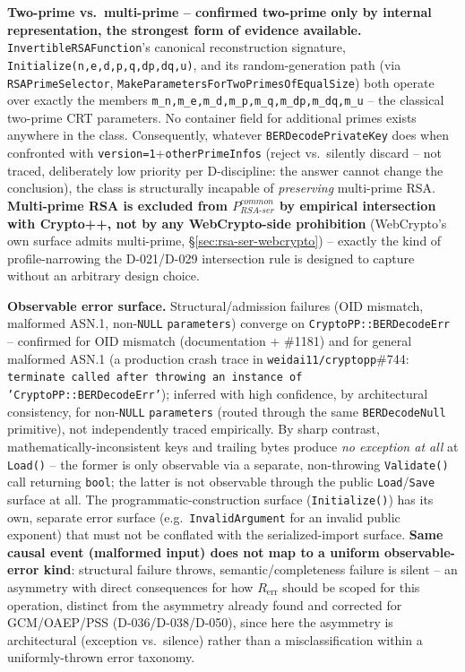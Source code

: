 \documentclass[11pt,a4paper]{article}
\begin{document}
\textbf{Two-prime vs.\ multi-prime -- confirmed two-prime only by internal representation, the strongest form of evidence available.} \texttt{InvertibleRSAFunction}'s canonical reconstruction signature, \texttt{Initialize(n,e,d,p,q,dp,dq,u)}, and its random-generation path (via \texttt{RSAPrimeSelector}, \texttt{MakeParametersForTwoPrimesOfEqualSize}) both operate over exactly the members \texttt{m\_n,m\_e,m\_d,m\_p,m\_q,m\_dp,m\_dq,m\_u} -- the classical two-prime CRT parameters. No container field for additional primes exists anywhere in the class. Consequently, whatever \texttt{BERDecodePrivateKey} does when confronted with \texttt{version=1}+\texttt{otherPrimeInfos} (reject vs.\ silently discard -- not traced, deliberately low priority per D-discipline: the answer cannot change the conclusion), the class is structurally incapable of \emph{preserving} multi-prime RSA. \textbf{Multi-prime RSA is excluded from $P_{RSA\text{-}ser}^{common}$ by empirical intersection with Crypto++, not by any WebCrypto-side prohibition} (WebCrypto's own surface admits multi-prime, \S\ref{sec:rsa-ser-webcrypto}) -- exactly the kind of profile-narrowing the D-021/D-029 intersection rule is designed to capture without an arbitrary design choice.

\textbf{Observable error surface.} Structural/admission failures (OID mismatch, malformed ASN.1, non-\texttt{NULL} \texttt{parameters}) converge on \texttt{CryptoPP::BERDecodeErr} -- confirmed for OID mismatch (documentation + \#1181) and for general malformed ASN.1 (a production crash trace in \texttt{weidai11/cryptopp}\#744: \texttt{terminate called after throwing an instance of 'CryptoPP::BERDecodeErr'}); inferred with high confidence, by architectural consistency, for non-\texttt{NULL} \texttt{parameters} (routed through the same \texttt{BERDecodeNull} primitive), not independently traced empirically. By sharp contrast, mathematically-inconsistent keys and trailing bytes produce \emph{no exception at all} at \texttt{Load()} -- the former is only observable via a separate, non-throwing \texttt{Validate()} call returning \texttt{bool}; the latter is not observable through the public \texttt{Load}/\texttt{Save} surface at all. The programmatic-construction surface (\texttt{Initialize()}) has its own, separate error surface (e.g.\ \texttt{InvalidArgument} for an invalid public exponent) that must not be conflated with the serialized-import surface. \textbf{Same causal event (malformed input) does not map to a uniform observable-error kind}: structural failure throws, semantic/completeness failure is silent -- an asymmetry with direct consequences for how $R_{\text{err}}$ should be scoped for this operation, distinct from the asymmetry already found and corrected for GCM/OAEP/PSS (D-036/D-038/D-050), since here the asymmetry is architectural (exception vs.\ silence) rather than a misclassification within a uniformly-thrown error taxonomy.
\end{document}
